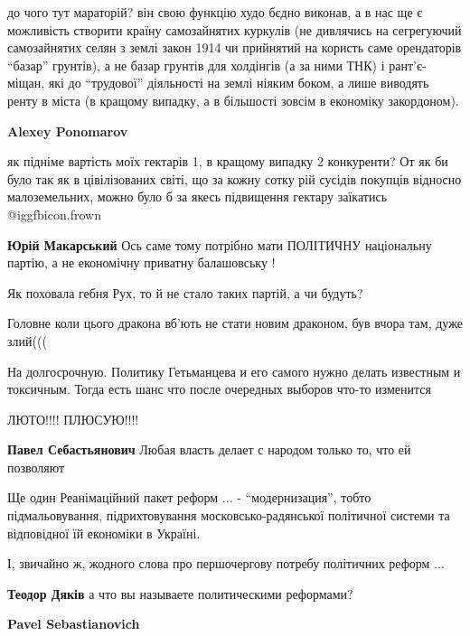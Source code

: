 \begin{itemize}
\begin{itemize}
до чого тут мараторій? він свою функцію худо бєдно виконав, а в нас ще є
можливість створити країну самозайнятих куркулів (не дивлячись на сегрегуючий
самозайнятих селян з землі закон 1914 чи прийнятий на користь саме орендаторів
\enquote{базар} грунтів), а не базар грунтів для холдінгів (а за ними ТНК) і
рант'є-міщан, які до \enquote{трудової} діяльності на землі ніяким боком, а лише виводять
ренту в міста (в кращому випадку, а в більшості зовсім в економіку закордоном).

\textbf{Alexey Ponomarov} 

як підніме вартість моїх гектарів 1, в кращому випадку 2 конкуренти? От як би
було так як в цівілізованих світі, що за кожну сотку рій сусідів покупців
відносно малоземельних, можно було б за якесь підвищення гектару заїкатись  @igg{fbicon.frown} 

\textbf{Юрій Макарський} Ось саме тому потрібно мати ПОЛІТИЧНУ національну партію, а не економічну приватну балашовську !

Як поховала гебня Рух, то й не стало таких партій, а чи будуть?
\end{itemize} %


Головне коли цього дракона вб'ють не стати новим драконом, був вчора там, дуже
злий(((


На долгосрочную. Политику Гетьманцева и его самого нужно делать известным и
токсичным. Тогда есть шанс что после очередных выборов что-то изменится

ЛЮТО!!!! ПЛЮСУЮ!!!!

\textbf{Павел Себастьянович} Любая власть делает с народом только то, что ей позволяют


Ще один Реанімаційний пакет реформ ... - \enquote{модернизация}, тобто підмальовування,
підрихтовування московсько-радянської політичної системи та відповідної їй
економіки в Україні.

І, звичайно ж, жодного слова про першочергову потребу політичних реформ ...

\begin{itemize} %
\textbf{Теодор Дяків} а что вы называете политическими реформами?

\textbf{Pavel Sebastianovich} 


\end{itemize}
\end{itemize}
